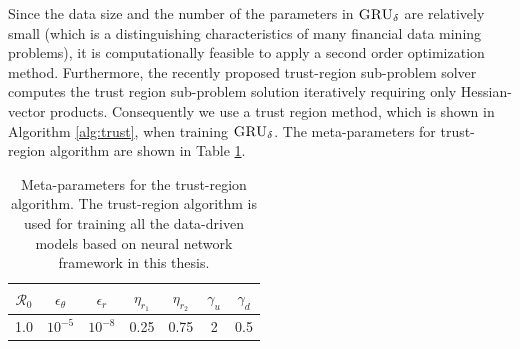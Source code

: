 \documentclass[letterpaper,12pt,titlepage,oneside,final]{book}
\numberwithin{equation}{section}
\theoremstyle{definition}
\newcommand{\model}{\textsc{GRU}_\delta}
\begin{document}
Since the data size and the number of the parameters in $\model$ are relatively small (which is a distinguishing characteristics of many financial data mining  problems), it is computationally feasible to apply a second order optimization method.  Furthermore, the recently proposed trust-region sub-problem solver \citep{lenders2018trlib} computes the trust region sub-problem solution iteratively requiring only Hessian-vector products. %
Consequently we use a trust region method, which is shown in Algorithm \ref{alg:trust}, when training $\model$.  The meta-parameters for trust-region algorithm are shown in Table \ref{para2}. 
\begin{table}[htp!]
	\begin{center}
	\begin{tabular}{|c|c|c|c|c|c|c|}
	\hline
	$\mathcal{R}_0$&
	$\epsilon_{\theta}$& 
	$\epsilon_{r}$&
	$\eta_{r_1}$&
	$\eta_{r_2}$&
	$\gamma_u$&
	$\gamma_d$  \\ \hline
	 1.0&$10^{-5}$&$10^{-8}$&0.25&0.75 &2 & 0.5  \\    \hline
	\end{tabular}
	\end{center}
	
	\caption{Meta-parameters for the trust-region algorithm. The trust-region algorithm is used for training  all the data-driven models based on neural network framework in this thesis.}
	\label{para2}
	\end{table}
\end{document}
